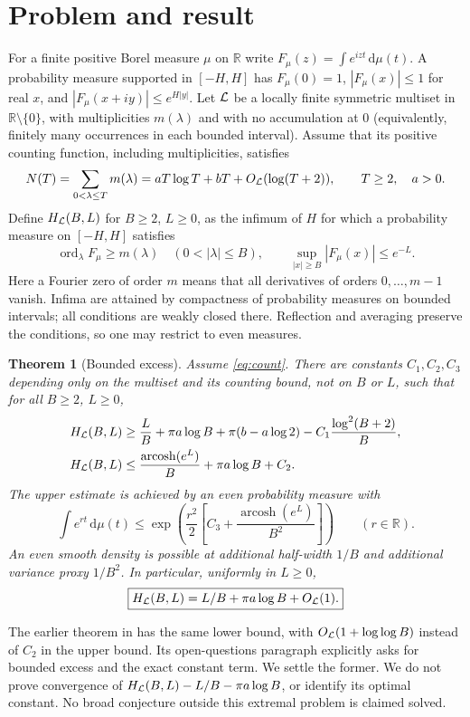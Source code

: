 \documentclass[11pt,letterpaper]{article}
\newtheorem{theorem}{Theorem}[section]
\theoremstyle{remark}\newtheorem{remark}[theorem]{Remark}
\newcommand{\R}{\mathbb R}\newcommand{\C}{\mathbb C}\newcommand{\N}{\mathbb N}
\newcommand{\dd}{\,\mathrm d}\newcommand{\sinc}{\operatorname{sinc}}
\newcommand{\ord}{\operatorname{ord}}\newcommand{\supp}{\operatorname{supp}}
\newcommand{\arcosh}{\operatorname{arcosh}}\newcommand{\sech}{\operatorname{sech}}
\begin{document}
\section{Problem and result}
For a finite positive Borel measure $\mu$ on $\R$ write
$F_\mu(z)=\int e^{izt}\dd\mu(t)$. A probability measure supported in $[-H,H]$ has $F_\mu(0)=1$, $|F_\mu(x)|\le1$ for real $x$, and $|F_\mu(x+iy)|\le e^{H|y|}$. Let $\mathcal L$ be a locally finite symmetric multiset in $\R\setminus\{0\}$, with multiplicities $m(\lambda)$ and with no accumulation at $0$ (equivalently, finitely many occurrences in each bounded interval). Assume that its positive counting function, including multiplicities, satisfies
\begin{equation}\label{eq:count}
 N(T)=\sum_{0<\lambda\le T}m(\lambda)=aT\log T+bT+O_{\mathcal L}(\log(T+2)),\qquad T\ge2,\quad a>0.
\end{equation}
Define $H_{\mathcal L}(B,L)$ for $B\ge2$, $L\ge0$, as the infimum of $H$ for which a probability measure on $[-H,H]$ satisfies
\begin{equation}\label{eq:constraints}
 \ord_\lambda F_\mu\ge m(\lambda)\quad(0<|\lambda|\le B),\qquad
 \sup_{|x|\ge B}|F_\mu(x)|\le e^{-L}.
\end{equation}
Here a Fourier zero of order $m$ means that all derivatives of orders $0,\ldots,m-1$ vanish. Infima are attained by compactness of probability measures on bounded intervals; all conditions are weakly closed there. Reflection and averaging preserve the conditions, so one may restrict to even measures.

\begin{theorem}[Bounded excess]\label{thm:main}
Assume \eqref{eq:count}. There are constants $C_1,C_2,C_3$ depending only on the multiset and its counting bound, not on $B$ or $L$, such that for all $B\ge2$, $L\ge0$,
\begin{align}
 H_{\Lam}(B,L)&\ge \frac{L}{B}+\pi a\log B+\pi(b-a\log2)-C_1\frac{\log^2(B+2)}{B},\label{eq:lower}\\
 H_{\Lam}(B,L)&\le \frac{\arcosh(e^L)}{B}+\pi a\log B+C_2.\label{eq:upper}
\end{align}
The upper estimate is achieved by an even probability measure with
\begin{equation}\label{eq:mgf}
 \int e^{rt}\dd\mu(t)\le \exp\left(\frac{r^2}{2}\left[C_3+\frac{\arcosh(e^L)}{B^2}\right]\right)\qquad(r\in\R).
\end{equation}
An even smooth density is possible at additional half-width $1/B$ and additional variance proxy $1/B^2$. In particular, uniformly in $L\ge0$,
\begin{equation}\label{eq:main}
 \boxed{H_{\mathcal L}(B,L)=L/B+\pi a\log B+O_{\mathcal L}(1).}
\end{equation}
\end{theorem}
The earlier theorem in \cite{ProveIt} has the same lower bound, with $O_{\mathcal L}(1+\log\log B)$ instead of $C_2$ in the upper bound. Its open-questions paragraph explicitly asks for bounded excess and the exact constant term. We settle the former. We do not prove convergence of $H_{\mathcal L}(B,L)-L/B-\pi a\log B$, or identify its optimal constant. No broad conjecture outside this extremal problem is claimed solved.
\end{document}

